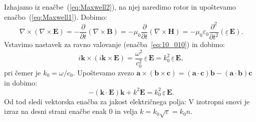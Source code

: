 Izhajamo iz enačbe~(\ref{eq:Maxwell2}), na njej naredimo rotor in upoštevamo
enačbo~(\ref{eq:Maxwell1}). Dobimo:
\begin{equation}
\nabla \times \left( \nabla \times \mathbf{E} \right) = - \frac{\partial}{\partial t} 
\left( \nabla \times \mathbf{B} \right) = -\mu_0 \frac{\partial}{\partial t} 
\left( \nabla \times \mathbf{H} \right) = -\mu_0 \varepsilon_0 
\frac{\partial^2}{\partial t^2} \left( \underline{\varepsilon}\,\mathbf{E} \right).
\label{eq:10_021}
\end{equation}
Vstavimo nastavek za ravno valovanje (enačba~\ref{eq:10_010}) in dobimo:
\begin{equation}
i\mathbf{k}\times \left( i \mathbf{k} \times \mathbf{E}\right) = 
\frac{\omega^2}{c_0^2}\,\underline{\varepsilon}\,\mathbf{E} = 
k_0^2\,\underline{\varepsilon}\,\mathbf{E},
\label{eq:10_022}
\end{equation}
pri čemer je $k_0 = \omega / c_0$. Upoštevamo zvezo $\mathbf{a}\times
\left( \mathbf{b}\times \mathbf{c}\right) = \left(\mathbf{a}\cdot 
\mathbf{c}\right) \mathbf{b} - \left(\mathbf{a}\cdot \mathbf{b}\right) \mathbf{c}$
in dobimo:
\begin{equation}
-\left(\mathbf{k}\cdot \mathbf{E}\right)\mathbf{k} + k^2 \mathbf{E} = 
k_0^2\,\underline{\varepsilon}\,\mathbf{E}.
\label{eq:10_024}
\end{equation}
Od tod sledi vektorska enačba za jakost električnega polja:
V izotropni snovi je izraz na desni strani enačbe enak 0 
in velja $k = k_0\sqrt{\varepsilon} = k_0 n$. 

